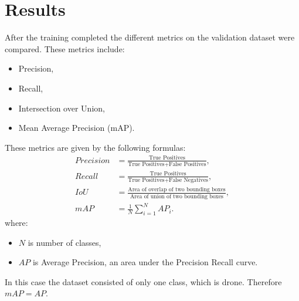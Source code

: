 \documentclass[twoside]{ctuthesis}
\theoremstyle{plain}
\theoremstyle{definition}
\theoremstyle{note}
\begin{document}
\chapter{Results}
After the training completed the different metrics on the validation dataset were compared. These metrics include:
\begin{itemize}
	\item Precision,
	\item Recall,
	\item Intersection over Union,
	\item Mean Average Precision (mAP).
\end{itemize}
These metrics are given by the following formulas:
\begin{equation}
\begin{aligned}
	Precision &= \frac{\text{True Positives}}{\text{True Positives} + \text{False Positives}},\\
	Recall &= \frac{\text{True Positives}}{\text{True Positives} + \text{False Negatives}},\\
	IoU &= \frac{\text{Area of overlap of two bounding boxes}}{\text{Area of union of two bounding boxes}},\\
	mAP &= \frac{1}{N}\sum^N_{i=1}AP_i.
\end{aligned}
\end{equation}
where:
\begin{itemize}
	\item $N$ is number of classes,
	\item $AP$ is Average Precision, an area under the Precision Recall curve.
\end{itemize}
In this case the dataset consisted of only one class, which is drone. Therefore $mAP=AP$.
\end{document}
